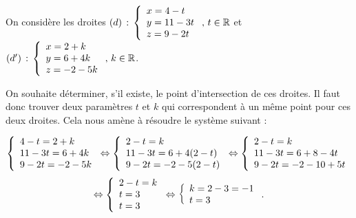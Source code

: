 \documentclass[11pt,fleqn, openany]{book} %
\begin{document}
\begin{example}On considère les droites $(d)\,:\,\left\{ \renewcommand{\arraystretch}{1}\begin{array}{l}x=4-t \\ y=11-3t \\ z = 9-2t \\
\end{array}\right.,\, t \in \mathbb{R}$ et $(d')\,:\,\left\{ \renewcommand{\arraystretch}{1}\begin{array}{l}x=2+k \\ y=6+4k \\ z = -2-5k \\
\end{array}\right.,\, k \in \mathbb{R}$.

On souhaite déterminer, s'il existe, le point d'intersection de ces droites. Il faut donc trouver deux paramètres $t$ et $k$ qui correspondent à un même point pour ces deux droites. Cela nous amène à résoudre le système suivant :

\[\left\{\renewcommand{\arraystretch}{1}\begin{array}{l}4-t=2+k \\ 11-3t=6+4k \\ 9-2t=-2-5k \\\end{array}\right. \Leftrightarrow \left\{\renewcommand{\arraystretch}{1}\begin{array}{l}2-t=k \\ 11-3t=6+4(2-t) \\ 9-2t=-2-5(2-t) \\\end{array}\right. \Leftrightarrow \left\{\renewcommand{\arraystretch}{1}\begin{array}{l}2-t=k \\ 11-3t=6+8-4t \\ 9-2t=-2-10+5t \\\end{array}\right.\]
\[  \Leftrightarrow \left\{\renewcommand{\arraystretch}{1}\begin{array}{l}2-t=k \\ t=3 \\ t=3 \\\end{array}\right.\Leftrightarrow \left\{\renewcommand{\arraystretch}{1}\begin{array}{l}k=2-3=-1 \\ t=3  \\\end{array}\right. .\]


\end{example}
\end{document}
